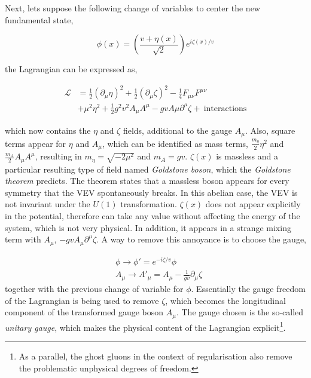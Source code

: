 Next, lets suppose the following change of variables to center the new fundamental state,

\begin{equation}
    \phi(x)=\left( \frac{v+\eta(x)}{\sqrt{2}} \right) e^{i\zeta(x)/v}
\end{equation}

the Lagrangian can be expressed as,

\begin{equation}
\begin{split}
\mathcal{L} &= \frac{1}{2}(\partial_\mu\eta)^2 + \frac{1}{2}(\partial_\mu\zeta)^2 - \frac{1}{4}F_{\mu\nu}F^{\mu\nu}\\
&+\mu^2\eta^2 + \frac{1}{2}g^2v^2A_\mu A^\mu - gv A\mu \partial^\mu\zeta +\ \text{interactions}
\end{split}
\end{equation}

which now contains the $\eta$ and $\zeta$ fields, additional to the gauge $A_\mu$. Also, square terms appear for $\eta$ and $A_\mu$,
which can be identified as mass terms, $\frac{m_\eta}{2}\eta^2$ and $\frac{m_A}{2}A_\mu A^\mu$,
resulting in $m_\eta=\sqrt{-2\mu^2}$ and $m_A=gv$. $\zeta(x)$ is massless and a particular resulting type of field named
\textit{Goldstone boson}, which the \textit{Goldstone theorem} predicts.
The theorem states that a massless boson appears for every symmetry that the \acrshort{VEV} spontaneously breaks.
In this abelian case, the \acrshort{VEV} is not invariant under the $U(1)$ transformation.
$\zeta(x)$ does not appear explicitly in the potential, therefore can take any value without affecting the energy of the system,
which is not very physical. In addition, it appears in a strange mixing term with $A_\mu$, $-gvA_\mu\partial^\mu\zeta$.
A way to remove this annoyance is to choose the gauge,

\begin{equation}
\begin{split}
    &\phi\rightarrow\phi'=e^{-i\zeta/v}\phi \\
    &A_\mu\rightarrow A'_\mu = A_\mu-\frac{1}{gv}\partial_\mu\zeta
\end{split}
\end{equation}
together with the previous change of variable for $\phi$. Essentially the gauge freedom of the Lagrangian is being used to remove $\zeta$,
which becomes the longitudinal component of the transformed gauge boson $A_\mu$.
The gauge chosen is the so-called \textit{unitary gauge}, which makes the physical content of the Lagrangian explicit\footnote{As a parallel, the ghost gluons in the context of regularisation also remove the problematic unphysical degrees of freedom.}.

